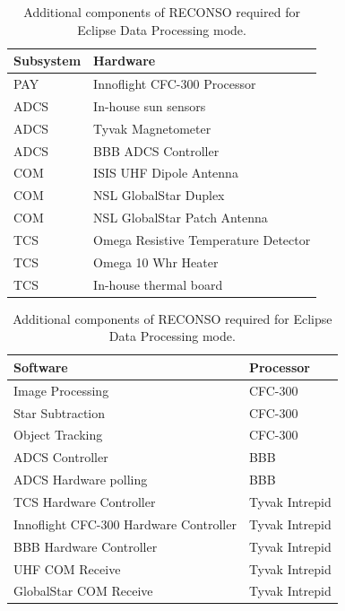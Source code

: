 \documentclass{article}
\begin{document}
\begin{table}[h!]
\caption{Additional components of RECONSO required for Eclipse Data Processing mode.}
\begin{adjustbox}{center}
\begin{tabular}{|l|l|}
\hline
Subsystem & Hardware \\ \hline \hline
PAY & Innoflight CFC-300 Processor  \\ \hline \hline
ADCS & In-house sun sensors  \\ \hline
ADCS & Tyvak Magnetometer \\ \hline
ADCS & BBB ADCS Controller \\ \hline \hline
COM & ISIS UHF Dipole Antenna  \\ \hline
COM & NSL GlobalStar Duplex  \\ \hline
COM & NSL GlobalStar Patch Antenna \\ \hline \hline
TCS & Omega Resistive Temperature Detector \\ \hline
TCS & Omega 10 Whr Heater  \\ \hline
TCS & In-house thermal board \\ \hline
\end{tabular}

\quad

\begin{tabular}{|l|l|}
\hline
Software & Processor \\ \hline \hline
Image Processing & CFC-300 \\ \hline
Star Subtraction & CFC-300 \\ \hline
Object Tracking & CFC-300 \\ \hline \hline
ADCS Controller & BBB \\ \hline
ADCS Hardware polling & BBB \\ \hline \hline
TCS Hardware Controller & Tyvak Intrepid \\ \hline
Innoflight CFC-300 Hardware Controller & Tyvak Intrepid \\ \hline
BBB Hardware Controller & Tyvak Intrepid \\ \hline
UHF COM Receive & Tyvak Intrepid \\ \hline
GlobalStar COM Receive & Tyvak Intrepid \\ \hline
\end{tabular}
\end{adjustbox}
\end{table}
\end{document}
